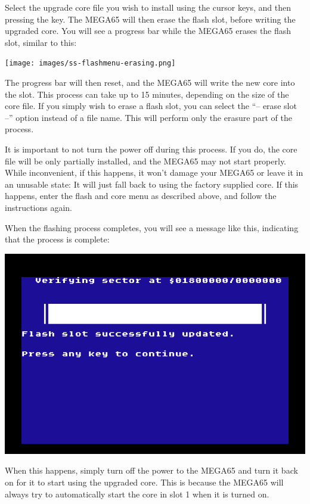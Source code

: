 Select the upgrade core file you wish to
install using the cursor keys, and then pressing the  key.  The MEGA65 will then erase
the flash slot, before writing the upgraded core.  You will see a progress bar while the MEGA65 erases
the flash slot, similar to this:

\texttt{[image: images/ss-flashmenu-erasing.png]}

The progress bar will then reset, and the MEGA65 will
write the new core into the slot. This process can take up to 15
minutes, depending on the size of the core file.  If you simply wish
to erase a flash slot, you can select the
``-- erase slot --'' option instead of a file name. This will perform
only the erasure part of the process.

It is important to not turn the power off during this process. If you do, the core file will be
only partially installed, and the MEGA65 may not start properly.
While
inconvenient, if this happens, it won't damage your MEGA65 or leave it
in an unusable state: It will just fall back to using the factory
supplied core.
If this happens, enter the flash and core
menu as described above, and follow the instructions again.

When the flashing process completes, you will see a message like this, indicating that the process is complete:

\includegraphics[width=\linewidth]{images/ss-flashmenu-done.png}


When this happens, simply turn off the power to the MEGA65 and turn it back on for it to start using the
upgraded core.  This is because the MEGA65 will always try to automatically start the core in slot 1 when
it is turned on.

